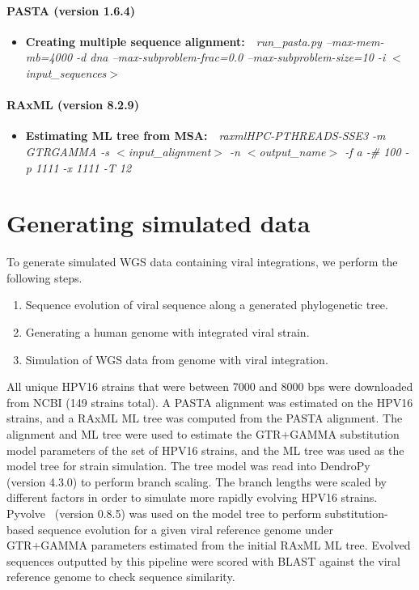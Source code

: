 \documentclass[12pt]{article}
\begin{document}
\paragraph{\textbf{PASTA (version 1.6.4)}~\cite{Mirarab2014}}
\begin{itemize}
\item \textbf{Creating multiple sequence alignment:}~~\emph{run\_pasta.py --max-mem-mb=4000 -d dna --max-subproblem-frac=0.0 --max-subproblem-size=10 -i $<$input\_sequences$>$}
\end{itemize}

\paragraph{\textbf{RAxML (version 8.2.9)}~\cite{Stamatakis2014}}
\begin{itemize}
\item \textbf{Estimating ML tree from MSA:}~~\emph{raxmlHPC-PTHREADS-SSE3 -m GTRGAMMA -s $<$input\_alignment$>$  -n $<$output\_name$>$ -f a -\# 100 -p 1111 -x 1111 -T 12}
\end{itemize}

\section{Generating simulated data}\label{simulation}
To generate simulated WGS data containing viral integrations, we perform the following steps.
\begin{enumerate}
\item Sequence evolution of viral sequence along a generated phylogenetic tree.
\item Generating a human genome with integrated viral strain.
\item Simulation of WGS data from genome with viral integration.
\end{enumerate}
All unique HPV16 strains that were between 7000 and 8000 bps were downloaded from NCBI (149 strains total).  A PASTA alignment was estimated on the HPV16 strains, and a RAxML ML tree was computed from the PASTA alignment.  The alignment and ML tree were used to estimate the GTR+GAMMA substitution model parameters of the set of HPV16 strains, and the ML tree was used as the model tree for strain simulation.  The tree model was read into DendroPy~\cite{Sukumaran2010} (version 4.3.0) to perform branch scaling.  The branch lengths were scaled by different factors in order to simulate more rapidly evolving HPV16 strains.  Pyvolve~\cite{Spielman2015} (version 0.8.5) was used on the model tree to perform substitution-based sequence evolution for a given viral reference genome under GTR+GAMMA parameters estimated from the initial RAxML ML tree.  Evolved sequences outputted by this pipeline were scored with BLAST against the viral reference genome to check sequence similarity.
\end{document}
